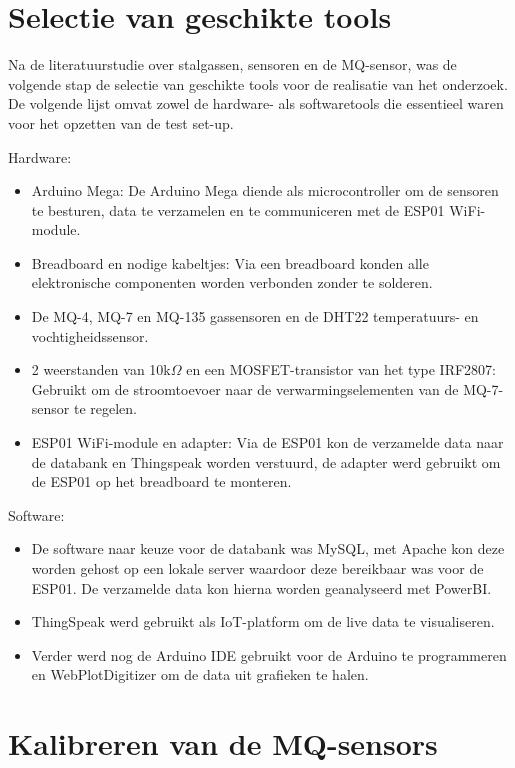\section{Selectie van geschikte tools}%
\label{sec:selectie}

Na de literatuurstudie over stalgassen, sensoren en de MQ-sensor, was de volgende stap de selectie van geschikte tools voor de realisatie van het onderzoek. De volgende lijst omvat zowel de hardware- als softwaretools die essentieel waren voor het opzetten van de test set-up.

Hardware:
\begin{itemize}
    \item Arduino Mega: De Arduino Mega diende als microcontroller om de sensoren te besturen, data te verzamelen en te communiceren met de ESP01 WiFi-module.
    \item Breadboard en nodige kabeltjes: Via een breadboard konden alle elektronische componenten worden verbonden zonder te solderen.
    \item De MQ-4, MQ-7 en MQ-135 gassensoren en de DHT22 temperatuurs- en vochtigheidssensor.
    \item 2 weerstanden van 10k$\Omega$ en een MOSFET-transistor van het type IRF2807: Gebruikt om de stroomtoevoer naar de verwarmingselementen van de MQ-7-sensor te regelen.
    \item ESP01 WiFi-module en adapter: Via de ESP01 kon de verzamelde data naar de databank en Thingspeak worden verstuurd, de adapter werd gebruikt om de ESP01 op het breadboard te monteren.
\end{itemize}

Software:
\begin{itemize}
    \item De software naar keuze voor de databank was MySQL, met Apache kon deze worden gehost op een lokale server waardoor deze bereikbaar was voor de ESP01. De verzamelde data kon hierna worden geanalyseerd met PowerBI.
    \item ThingSpeak werd gebruikt als IoT-platform om de live data te visualiseren.
    \item Verder werd nog de Arduino IDE gebruikt voor de Arduino te programmeren en WebPlotDigitizer om de data uit grafieken te halen.
\end{itemize}


\section{Kalibreren van de MQ-sensors}%
\label{sec:kalibratie}

